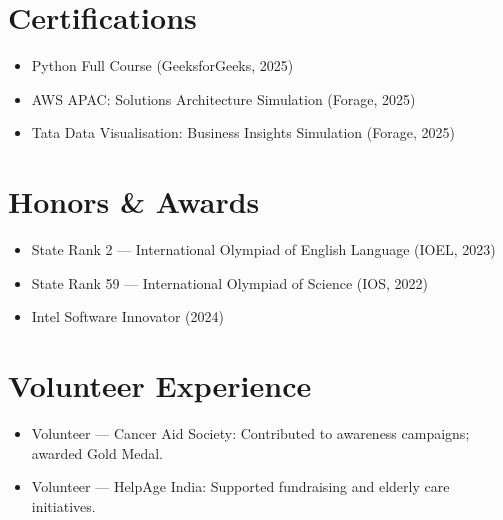 \documentclass[a4paper,10pt]{article}
\begin{document}
\vspace{1mm}

\section*{Certifications}

\begin{itemize}[leftmargin=2.2em]
    \item Python Full Course (GeeksforGeeks, 2025)
    \item AWS APAC: Solutions Architecture Simulation (Forage, 2025)
    \item Tata Data Visualisation: Business Insights Simulation (Forage, 2025)
\end{itemize}

\vspace{1mm}

\section*{Honors \& Awards}

\begin{itemize}[leftmargin=2.2em]
    \item State Rank 2 --- International Olympiad of English Language (IOEL, 2023)
    \item State Rank 59 --- International Olympiad of Science (IOS, 2022)
    \item Intel Software Innovator (2024)
\end{itemize}

\vspace{1mm}

\section*{Volunteer Experience}

\begin{itemize}[leftmargin=2.2em]
    \item Volunteer --- Cancer Aid Society: Contributed to awareness campaigns; awarded Gold Medal.
    \item Volunteer --- HelpAge India: Supported fundraising and elderly care initiatives.
\end{itemize}
\end{document}
